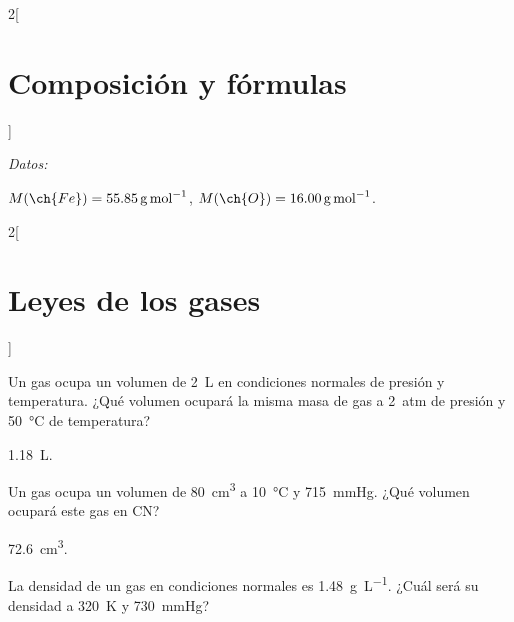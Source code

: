 \documentclass[10pt]{article}
\newenvironment{gexdatos}{
      \vspace{2pt}
      \noindent\textit{Datos:}
    }{\vspace{5pt}}
\begin{document}
\begin{multicols}{2}[
  \section{Composición y fórmulas}
  ]
\begin{exercise}[
      tags    = {termodinámica, entalpía, entalpia de reacción, calor},
      topics  = {química, termoquímica, termodinámica},
      source  = {FQ 1B SAN 2015, p44, e53},
    ]
    \begin{gexdatos}
      \( M(\ch{Fe}) = \SI{55.85}{\gram\per\mole} \),
      \( M(\ch{O}) = \SI{16.00}{\gram\per\mole} \).
    \end{gexdatos}
  \end{exercise}

  \begin{solution}
  \end{solution}
\end{multicols}




\begin{multicols}{2}[
  \section{Leyes de los gases}
  ]

  \begin{exercise}[
      tags    = {termodinámica, entalpía, entalpia de reacción, calor},
      topics  = {química, termoquímica, termodinámica},
      source  = {FQ 1B OXF 2015, p60, e46},
    ]
    Un gas ocupa un volumen de \SI{2}{\liter} en condiciones normales de presión y temperatura. ¿Qué volumen ocupará la misma masa de gas a \SI{2}{atm} de presión y \SI{50}{\celsius} de temperatura?
  \end{exercise}

  \begin{solution}
    \SI{1.18}{\liter}.
  \end{solution}




  \begin{exercise}[
      tags    = {termodinámica, entalpía, entalpia de reacción, calor},
      topics  = {química, termoquímica, termodinámica},
      source  = {FQ 1B OXF 2015, p60, e16},
    ]
    Un gas ocupa un volumen de \SI{80}{\cubic\centi\meter} a \SI{10}{\celsius} y \SI{715}{\mmHg}. ¿Qué volumen ocupará este gas en CN?
  \end{exercise}

  \begin{solution}
    \SI{72.6}{\cubic\centi\meter}.
  \end{solution}




  \begin{exercise}[
      tags    = {termodinámica, entalpía, entalpia de reacción, calor},
      topics  = {química, termoquímica, termodinámica},
      source  = {FQ 1B OXF 2015, p60, e19},
    ]
    La densidad de un gas en condiciones normales es \SI{1.48}{\gram\per\liter}. ¿Cuál será su densidad a \SI{320}{\kelvin} y \SI{730}{\mmHg}?
  \end{exercise}


\end{multicols}
\end{document}
